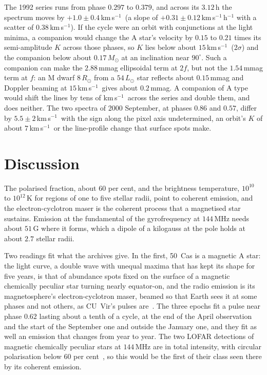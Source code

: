 \documentclass[3p,11pt]{elsarticle}
\newcommand{\kms}{km\,s$^{-1}$}
\newcommand{\Msun}{M_\odot}
\newcommand{\Rsun}{R_\odot}
\begin{document}
The 1992 series runs from phase $0.297$ to $0.379$, and across its $3.12$\,h the
spectrum moves by $+1.0\pm0.4$\,\kms\ (a slope of $+0.31\pm0.12$\,\kms\,h$^{-1}$ with a
scatter of $0.38$\,\kms). If the cycle were an orbit with conjunctions at the light
minima, a companion would change the A star's velocity by $0.15$ to $0.21$ times its
semi-amplitude $K$ across those phases, so $K$ lies below about $15$\,\kms\ ($2\sigma$)
and the companion below about $0.17\,\Msun$ at an inclination near $90^\circ$. Such a
companion can make the $2.88$\,mmag ellipsoidal term at $2f$, but not the $1.54$\,mmag
term at $f$: an M dwarf $8\,\Rsun$ from a $54\,L_\odot$ star reflects about $0.15$\,mmag
and Doppler beaming at $15$\,\kms\ gives about $0.2$\,mmag. A companion of A type would
shift the lines by tens of \kms\ across the series and double them, and does neither. The
two spectra of 2000 September, at phases $0.86$ and $0.57$, differ by
$5.5\pm2$\,\kms\ with the sign along the pixel axis undetermined, an orbit's $K$ of about
$7$\,\kms\ or the line-profile change that surface spots make.

\section{Discussion}\label{sec:discussion}

The polarised fraction, about $60$ per cent, and the brightness temperature, $10^{10}$
to $10^{12}$\,K for regions of one to five stellar radii, point to coherent emission, and
the electron-cyclotron maser is the coherent process that a magnetised star sustains.
Emission at the fundamental of the gyrofrequency at $144$\,MHz needs about $51$\,G where
it forms, which a dipole of a kilogauss at the pole holds at about $2.7$ stellar radii.

Two readings fit what the archives give. In the first, 50~Cas is a magnetic A star: the
light curve, a double wave with unequal maxima that has kept its shape for five years, is
that of abundance spots fixed on the surface of a magnetic chemically peculiar star
turning nearly equator-on, and the radio emission is its magnetosphere's
electron-cyclotron maser, beamed so that Earth sees it at some phases and not others, as
CU~Vir's pulses are~\cite{Trigilio2000}. The three epochs fit a pulse near phase $0.62$
lasting about a tenth of a cycle, at the end of the April observation and the start of
the September one and outside the January one, and they fit as well an emission that
changes from year to year. The two LOFAR detections of magnetic chemically peculiar
stars at $144$\,MHz are in total intensity, with circular polarisation below $60$ per
cent~\cite{Hajduk2022}, so this would be the first of their class seen there by its
coherent emission.
\end{document}
